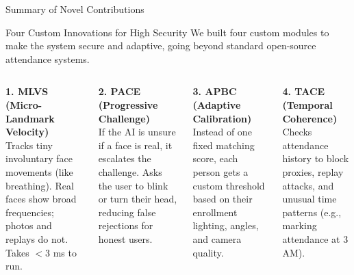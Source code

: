 \documentclass[aspectratio=169,11pt]{beamer}
\begin{document}
\begin{frame}{Summary of Novel Contributions}\small
\begin{block}{Four Custom Innovations for High Security}
\small We built four custom modules to make the system secure and adaptive, going beyond standard open-source attendance systems.
\end{block}
\vspace{4pt}
\begin{columns}[T]
\textbf{1. MLVS (Micro-Landmark Velocity)}\\[2pt]
\footnotesize
Tracks tiny involuntary face movements (like breathing). Real faces show broad frequencies; photos and replays do not. Takes $<$3 ms to run.
\vspace{8pt}

\textbf{2. PACE (Progressive Challenge)}\\[2pt]
\footnotesize
If the AI is unsure if a face is real, it escalates the challenge. Asks the user to blink or turn their head, reducing false rejections for honest users.

\textbf{3. APBC (Adaptive Calibration)}\\[2pt]
\footnotesize
Instead of one fixed matching score, each person gets a custom threshold based on their enrollment lighting, angles, and camera quality.
\vspace{8pt}

\textbf{4. TACE (Temporal Coherence)}\\[2pt]
\footnotesize
Checks attendance history to block proxies, replay attacks, and unusual time patterns (e.g., marking attendance at 3 AM).
\end{columns}
\end{frame}
\end{document}

